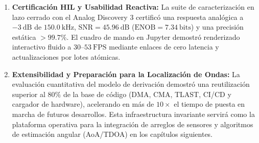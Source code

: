 \documentclass[standalone]{subfiles}
\begin{document}
\begin{enumerate}
    \item \textbf{Certificación HIL y Usabilidad Reactiva:} La suite de caracterización en lazo cerrado con el Analog Discovery 3 certificó una respuesta analógica a $-3~\text{dB}$ de $150.0~\text{kHz}$, $\text{SNR} = 45.96~\text{dB}$ ($\text{ENOB} = 7.34~\text{bits}$) y una precisión estática $> 99.7\%$. El cuadro de mando en Jupyter demostró renderizado interactivo fluido a $30\text{--}53~\text{FPS}$ mediante enlaces de cero latencia y actualizaciones por lotes atómicas.
    
    \item \textbf{Extensibilidad y Preparación para la Localización de Ondas:} La evaluación cuantitativa del modelo de derivación demostró una reutilización superior al $80\%$ de la base de código (DMA, CMA, TLAST, CI/CD y cargador de hardware), acelerando en más de $10\times$ el tiempo de puesta en marcha de futuros desarrollos. Esta infraestructura invariante servirá como la plataforma operativa para la integración de arreglos de sensores y algoritmos de estimación angular (AoA/TDOA) en los capítulos siguientes.
\end{enumerate}

\ifSubfilesClassLoaded{%
    \printbibliography
}{}
\end{document}
